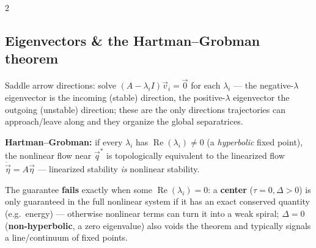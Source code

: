 \documentclass[10pt]{article}
\begin{document}
\begin{multicols}{2}
\subsection*{Eigenvectors \& the Hartman--Grobman theorem}
Saddle arrow directions: solve $(A-\lambda_iI)\vec v_i=\vec 0$ for each $\lambda_i$ --- the negative-$\lambda$ eigenvector is the incoming (stable) direction, the positive-$\lambda$ eigenvector the outgoing (unstable) direction; these are the only directions trajectories can approach/leave along and they organize the global separatrices.
\begin{keybox}
\textbf{Hartman--Grobman:} if every $\lambda_i$ has $\operatorname{Re}(\lambda_i)\neq0$ (a \emph{hyperbolic} fixed point), the nonlinear flow near $\vec q^*$ is topologically equivalent to the linearized flow $\dot{\vec\eta}=A\vec\eta$ --- linearized stability \emph{is} nonlinear stability.
\end{keybox}
The guarantee \textbf{fails} exactly when some $\operatorname{Re}(\lambda_i)=0$: a \textbf{center} ($\tau=0,\Delta>0$) is only guaranteed in the full nonlinear system if it has an exact conserved quantity (e.g.\ energy) --- otherwise nonlinear terms can turn it into a weak spiral; $\Delta=0$ (\textbf{non-hyperbolic}, a zero eigenvalue) also voids the theorem and typically signals a line/continuum of fixed points.


\end{multicols}
\end{document}
